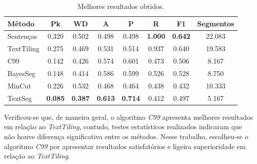 
	




\begin{table}[!h]
	\centering
\begin{tabular}{|l||c|c|c|c|c|c|c|} 
\hline 
\textbf{M\'{e}todo} & 
\textbf{Pk} & 
\textbf{WD} & 
\textbf{A } & 
\textbf{P } & 
\textbf{R } & 
\textbf{F1} & 
\textbf{Segmentos}\\ \hline

Senten\c{c}as & 0.320 & 0.502 & 0.498 & 0.498 & \textbf{1.000} & \textbf{0.642} & 22.083\\ \hline
TextTiling    & 0.275 & 0.469 & 0.531 & 0.514 & 0.937 & 0.640 & 19.583\\ \hline
C99           & 0.142 & 0.426 & 0.574 & 0.601 & 0.473 & 0.506 & 8.167\\ \hline
BayesSeg      & 0.148 & 0.414 & 0.586 & 0.599 & 0.526 & 0.528 & 8.750\\ \hline
MinCut        & 0.226 & 0.532 & 0.468 & 0.464 & 0.438 & 0.432 & 10.333\\ \hline
TextSeg       & \textbf{0.085} & \textbf{0.387} & \textbf{0.613} & \textbf{0.714} & 0.412 & 0.497 & 5.167\\ \hline
\end{tabular} 

	\caption{Melhores resultados obtidos.}
	\label{tab:configfinal}
\end{table}









Verificou-se que, de maneira geral, o algoritmo \textit{C99} apresenta melhores resultados em relação ao \textit{TextTiling}, contudo, testes estatísticos realizados indicaram que não houve diferença significativa entre os métodos. Nesse trabalho, escolheu-se o algoritmo \textit{C99} por apresentar resultados satisfatórios e ligeira superioridade em relação ao \textit{TextTiling}. 






